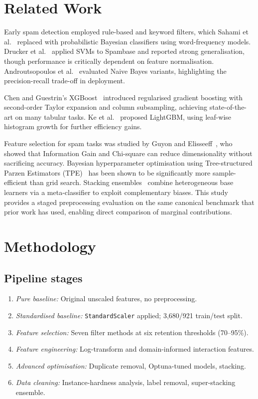 \documentclass[conference]{IEEEtran}
\begin{document}
\section{Related Work}

Early spam detection employed rule-based and keyword filters,
which Sahami et al.~\cite{ref3} replaced with probabilistic
Bayesian classifiers using word-frequency models. Drucker
et al.~\cite{ref4} applied SVMs to Spambase and reported strong
generalisation, though performance is critically dependent on
feature normalisation. Androutsopoulos et al.~\cite{ref5}
evaluated Naive Bayes variants, highlighting the precision-recall
trade-off in deployment.

Chen and Guestrin's XGBoost~\cite{ref6} introduced
regularised gradient boosting with second-order Taylor expansion
and column subsampling, achieving state-of-the-art on many
tabular tasks. Ke et al.~\cite{ref7} proposed LightGBM, using
leaf-wise histogram growth for further efficiency gains.

Feature selection for spam tasks was studied by Guyon and
Elisseeff~\cite{ref8}, who showed that Information Gain and
Chi-square can reduce dimensionality without sacrificing
accuracy. Bayesian
hyperparameter optimisation using Tree-structured Parzen
Estimators (TPE)~\cite{ref11} has been shown to be
significantly more sample-efficient than grid search. Stacking
ensembles~\cite{ref12} combine heterogeneous base learners via
a meta-classifier to exploit complementary biases. This study provides a staged preprocessing evaluation on the same
canonical benchmark that prior work has used, enabling
direct comparison of marginal contributions.

\section{Methodology}

\subsection{Pipeline stages}

\begin{enumerate}
  \item \textit{Pure baseline:} Original unscaled features,
        no preprocessing.
  \item \textit{Standardised baseline:} \texttt{StandardScaler}
        applied; 3,680/921 train/test split.
  \item \textit{Feature selection:} Seven filter methods at six
        retention thresholds (70--95\%).
  \item \textit{Feature engineering:} Log-transform and
        domain-informed interaction features.
  \item \textit{Advanced optimisation:} Duplicate removal,
        Optuna-tuned models, stacking.
  \item \textit{Data cleaning:} Instance-hardness analysis,
        label removal, super-stacking ensemble.
\end{enumerate}
\end{document}
